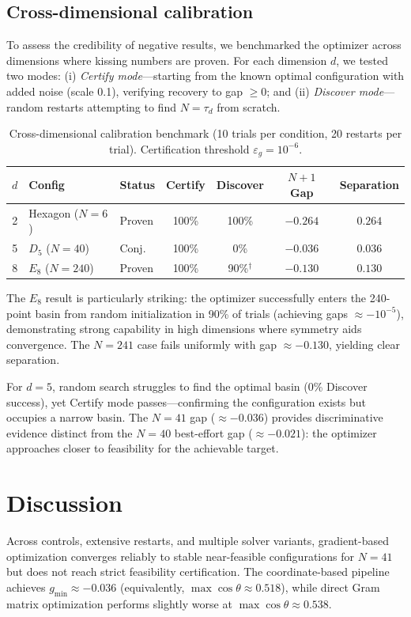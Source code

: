 \documentclass[11pt]{article}
\begin{document}
\subsection{Cross-dimensional calibration}
\label{sec:calibration}
To assess the credibility of negative results, we benchmarked the optimizer across dimensions where kissing numbers are proven. For each dimension $d$, we tested two modes: (i) \emph{Certify mode}---starting from the known optimal configuration with added noise (scale 0.1), verifying recovery to gap $\ge 0$; and (ii) \emph{Discover mode}---random restarts attempting to find $N=\tau_d$ from scratch.

\begin{table}[h]
\centering
\caption{Cross-dimensional calibration benchmark (10 trials per condition, 20 restarts per trial). Certification threshold $\varepsilon_g = 10^{-6}$.}
\label{tab:calibration}
\begin{tabular}{@{}rllcccc@{}}
\toprule
$d$ & Config & Status & Certify & Discover & $N{+}1$ Gap & Separation \\
\midrule
2 & Hexagon ($N{=}6$) & Proven & 100\% & 100\% & $-0.264$ & $0.264$ \\
5 & $D_5$ ($N{=}40$) & Conj. & 100\% & 0\% & $-0.036$ & $0.036$ \\
8 & $E_8$ ($N{=}240$) & Proven & 100\% & 90\%$^\dagger$ & $-0.130$ & $0.130$ \\
\bottomrule
\end{tabular}
\end{table}

The $E_8$ result is particularly striking: the optimizer successfully enters the 240-point basin from random initialization in 90\% of trials (achieving gaps $\approx -10^{-5}$), demonstrating strong capability in high dimensions where symmetry aids convergence. The $N=241$ case fails uniformly with gap $\approx -0.130$, yielding clear separation.

For $d=5$, random search struggles to find the optimal basin (0\% Discover success), yet Certify mode passes---confirming the configuration exists but occupies a narrow basin. The $N=41$ gap ($\approx -0.036$) provides discriminative evidence distinct from the $N=40$ best-effort gap ($\approx -0.021$): the optimizer approaches closer to feasibility for the achievable target.

\section{Discussion}
Across controls, extensive restarts, and multiple solver variants, gradient-based optimization converges reliably to stable near-feasible configurations for $N=41$ but does not reach strict feasibility certification.
The coordinate-based pipeline achieves $g_{\min}\approx -0.036$ (equivalently, $\max\cos\theta \approx 0.518$), while direct Gram matrix optimization performs slightly worse at $\max\cos\theta \approx 0.538$.
\end{document}
